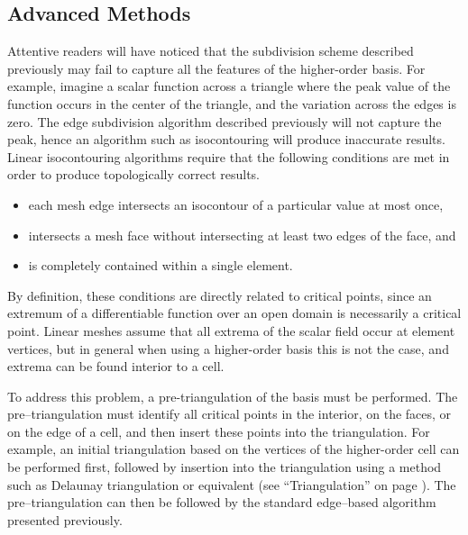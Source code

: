 \subsection{Advanced Methods}

Attentive readers will have noticed that the subdivision scheme described previously may fail to capture all the features of the higher-order basis. For example, imagine a scalar function across a triangle where the peak value of the function occurs in the center of the triangle, and the variation across the edges is zero. The edge subdivision algorithm described previously will not capture the peak, hence an algorithm such as isocontouring will produce inaccurate results. Linear isocontouring algorithms require that the following conditions are met in order to produce topologically correct results.

\begin{itemize}

\item each mesh edge intersects an isocontour of a particular value at most once,

\item intersects a mesh face without intersecting at least two edges of the face, and

\item is completely contained within a single element.

\end{itemize}

By definition, these conditions are directly related to critical points, since an extremum of a differentiable function over an open domain is necessarily a critical point. Linear meshes assume that all extrema of the scalar field occur at element vertices, but in general when using a higher-order basis this is not the case, and extrema can be found interior to a cell.

To address this problem, a pre-triangulation of the basis must be performed. The pre--triangulation must identify all critical points in the interior, on the faces, or on the edge of a cell, and then insert these points into the triangulation. For example, an initial triangulation based on the vertices of the higher-order cell can be performed first, followed by insertion into the triangulation using a method such as Delaunay triangulation or equivalent (see ``Triangulation'' on page \pageref{subsec:decimation.triangulation}). The pre--triangulation can then be followed by the standard edge--based algorithm presented previously.

